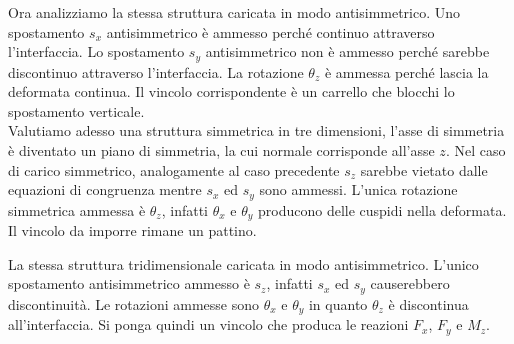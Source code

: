 Ora analizziamo la stessa struttura caricata in modo antisimmetrico. Uno spostamento $s_x$ antisimmetrico è ammesso perché continuo attraverso l'interfaccia.
Lo spostamento $s_y$ antisimmetrico non è ammesso perché sarebbe discontinuo attraverso l'interfaccia. La rotazione $\theta_z$ è ammessa perché lascia la deformata continua. Il vincolo corrispondente è un carrello che blocchi lo spostamento verticale.\\

Valutiamo adesso una struttura simmetrica in tre dimensioni, l'asse di simmetria è diventato un piano di simmetria, la cui normale corrisponde all'asse $z$.
Nel caso di carico simmetrico, analogamente al caso precedente $s_z$ sarebbe vietato dalle equazioni di congruenza mentre $s_x$ ed $s_y$ sono ammessi.
L'unica rotazione simmetrica ammessa è $\theta_z$, infatti $\theta_x$ e $\theta_y$ producono delle cuspidi nella deformata. Il vincolo da imporre rimane un pattino.

La stessa struttura tridimensionale caricata in modo antisimmetrico. L'unico spostamento antisimmetrico ammesso è $s_z$, infatti $s_x$ ed $s_y$ causerebbero discontinuità. Le rotazioni ammesse sono $\theta_x$ e $\theta_y$ in quanto $\theta_z$ è discontinua all'interfaccia.  Si ponga quindi un vincolo che produca le reazioni $F_x$, $F_y$ e $M_z$.

